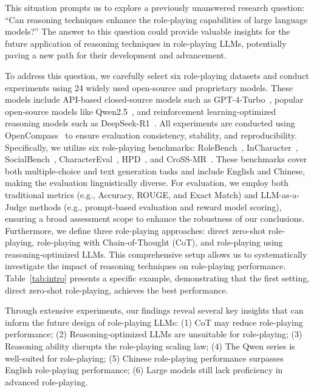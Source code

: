 This situation prompts us to explore a previously unanswered research question: “Can reasoning techniques enhance the role-playing capabilities of large language models?”
The answer to this question could provide valuable insights for the future application of reasoning techniques in role-playing LLMs, potentially paving a new path for their development and advancement.


To address this question, we carefully select six role-playing datasets and conduct experiments using 24 widely used open-source and proprietary models.
These models include API-based closed-source models such as GPT-4-Turbo~\citep{achiam2023gpt}, popular open-source models like Qwen2.5~\citep{yang2024qwen2}, and reinforcement learning-optimized reasoning models such as DeepSeek-R1~\citep{guo2025deepseek}.
All experiments are conducted using OpenCompass~\citep{2023opencompass} to ensure evaluation consistency, stability, and reproducibility. 
Specifically, we utilize six role-playing benchmarks: RoleBench~\citep{wang2023rolellm}, InCharacter~\citep{wang2024incharacter}, SocialBench~\citep{chen2024socialbench}, CharacterEval~\citep{tu2024charactereval}, HPD~\citep{chen2023hpd}, and CroSS-MR~\citep{yuan2024cross}. 
These benchmarks cover both multiple-choice and text generation tasks and include English and Chinese, making the evaluation linguistically diverse.
For evaluation, we employ both traditional metrics (e.g., Accuracy, ROUGE, and Exact Match) and LLM-as-a-Judge methods (e.g., prompt-based evaluation and reward model scoring), ensuring a broad assessment scope to enhance the robustness of our conclusions.
Furthermore, we define three role-playing approaches: direct zero-shot role-playing, role-playing with Chain-of-Thought (CoT), and role-playing using reasoning-optimized LLMs. 
This comprehensive setup allows us to systematically investigate the impact of reasoning techniques on role-playing performance.
Table~\ref{tab:intro} presents a specific example, demonstrating that the first setting, direct zero-shot role-playing, achieves the best performance.

Through extensive experiments, our findings reveal several key insights that can inform the future design of role-playing LLMs:
(1) CoT may reduce role-playing performance;
(2) Reasoning-optimized LLMs are unsuitable for role-playing;
(3) Reasoning ability disrupts the role-playing scaling law;
(4) The Qwen series is well-suited for role-playing;
(5) Chinese role-playing performance surpasses English role-playing performance;
(6) Large models still lack proficiency in advanced role-playing.

